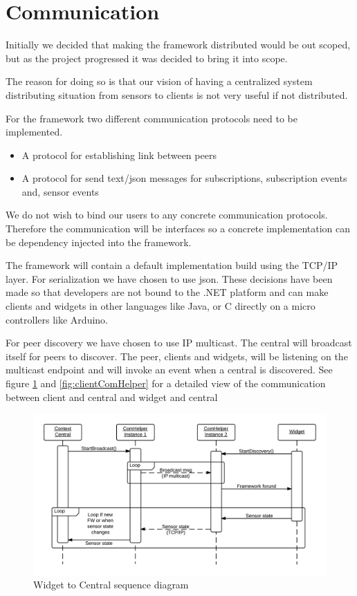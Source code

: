 \documentclass[]{report}
\begin{document}
\section{Communication}

Initially we decided that making the framework distributed would be out scoped, but as the project progressed it was decided to bring it into scope.

The reason for doing so is that our vision of having a centralized system distributing situation from sensors to clients is not very useful if not distributed.

For the framework two different communication protocols need to be implemented.\\

\begin{itemize}
	\item A protocol for establishing link between peers
	\item A protocol for send text/json messages for subscriptions, subscription events and, sensor events \\
\end{itemize}

We do not wish to bind our users to any concrete communication protocols. Therefore the communication will be interfaces so a concrete implementation can be dependency injected into the framework.

The framework will contain a default implementation build using the TCP/IP layer. For serialization we have chosen to use json. These decisions have been made so that developers are not bound to the .NET platform and can make clients and widgets in other languages like Java, or C directly on a micro controllers like Arduino.

For peer discovery we have chosen to use IP multicast. The central will broadcast itself for peers to discover. The peer, clients and widgets, will be listening on the multicast endpoint and will invoke an event when a central is discovered. See figure \ref{fig:widgetComHelper} and \ref{fig:clientComHelper} for a detailed view of the communication between client and central and widget and central

\begin{figure}
\centering
\includegraphics[width=\linewidth]{comHelperSequence-widget.png}
\caption{Widget to Central sequence diagram}
\label{fig:widgetComHelper}
\end{figure}
\end{document}
